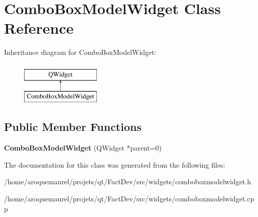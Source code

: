 \hypertarget{classComboBoxModelWidget}{\section{Combo\-Box\-Model\-Widget Class Reference}
\label{classComboBoxModelWidget}
}
Inheritance diagram for Combo\-Box\-Model\-Widget\-:\begin{figure}[H]
\begin{center}
\leavevmode
\includegraphics[height=2.000000cm]{d5/d79/classComboBoxModelWidget}
\end{center}
\end{figure}
\subsection*{Public Member Functions}
\begin{DoxyCompactItemize}
\item 
\hypertarget{classComboBoxModelWidget_a8632edda11e66ee50cfc89729b2feb3a}{{\bfseries Combo\-Box\-Model\-Widget} (Q\-Widget $\ast$parent=0)}\label{classComboBoxModelWidget_a8632edda11e66ee50cfc89729b2feb3a}

\end{DoxyCompactItemize}


The documentation for this class was generated from the following files\-:\begin{DoxyCompactItemize}
\item 
/home/aroquemaurel/projets/qt/\-Fact\-Dev/src/widgets/comboboxmodelwidget.\-h\item 
/home/aroquemaurel/projets/qt/\-Fact\-Dev/src/widgets/comboboxmodelwidget.\-cpp\end{DoxyCompactItemize}
